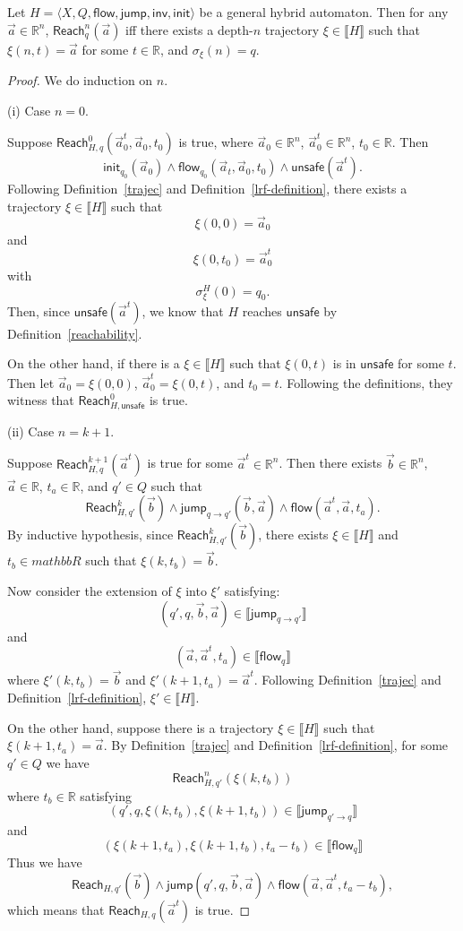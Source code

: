 \documentclass[envcountsect]{llncs}
\newcommand{\flow}{\mathsf{flow}}
\newcommand{\jump}{\mathsf{jump}}
\newcommand{\inv}{\mathsf{inv}}
\newcommand{\init}{\mathsf{init}}
\newcommand{\reach}{\mathsf{Reach}}
\newcommand{\unsafe}{\mathsf{unsafe}}
\begin{document}
\begin{proposition}\label{with-inv}
Let $H = \langle X, Q, \flow, \jump, \inv, \init \rangle$ be a general hybrid
automaton. Then for any $\vec a\in \mathbb{R}^n$, $\reach^n_q(\vec a)$ iff there
exists a depth-$n$ trajectory $\xi\in\llbracket H\rrbracket$ such that $\xi(n,
t) = \vec a$ for some $t\in\mathbb{R}$, and $\sigma_{\xi}(n) = q$. 
\end{proposition}


\begin{proof}
We do induction on $n$.

(i) Case $n=0$.

Suppose $\reach^0_{H,q}(\vec a_0^t, \vec a_0, t_0)$ is true, where $\vec a_0\in
\mathbb{R}^n$, $\vec a_0^t\in \mathbb{R}^n$, $t_0\in \mathbb{R}$. Then
$$\init_{q_0}(\vec a_0)\wedge\flow_{q_0}(\vec a_t, \vec a_0, t_0)  \wedge
\unsafe(\vec a^t).$$
Following Definition~\ref{trajec} and Definition~\ref{lrf-definition}, there
exists a trajectory $\xi\in \llbracket H\rrbracket$ such that
$$\xi(0,0) = \vec a_0$$
and 
$$\xi(0,t_0) = \vec a_0^t$$
with 
$$\sigma^H_{\xi}(0) = q_0.$$
Then, since $\unsafe(\vec a^t)$, we know that $H$ reaches $\unsafe$ by
Definition~\ref{reachability}.

On the other hand, if there is a $\xi\in \llbracket H\rrbracket$ such that
$\xi(0,t)$ is in $\unsafe$ for some $t$. Then let $\vec a_0 = \xi(0,0)$, $\vec
a_0^t = \xi(0,t)$, and $t_0 = t$. Following the definitions, they witness that
$\reach^0_{H,\unsafe}$ is true. 

(ii) Case $n=k+1$. 
 
Suppose $\reach_{H,q}^{k+1}(\vec a^t)$ is true for some $\vec
a^t\in\mathbb{R}^n$. Then there exists $\vec b\in \mathbb{R}^n$, $\vec a\in
\mathbb{R}$, $t_a\in \mathbb{R}$, and $q'\in Q$ such that
$$\reach_{H,q'}^k(\vec b) \wedge \jump_{q\rightarrow q'}(\vec b, \vec a)\wedge
\flow(\vec a^t, \vec a, t_a).$$ 
By inductive hypothesis, since $\reach_{H,q'}^k(\vec b)$, there exists
$\xi\in\llbracket H\rrbracket$ and $t_b\in mathbb{R}$ such that $\xi(k, t_b) =
\vec b$. 


Now consider the extension of $\xi$ into $\xi'$ satisfying:
$$(q', q, \vec b, \vec a)\in \llbracket \jump_{q\rightarrow q'}\rrbracket$$
and 
$$(\vec a, \vec a^t, t_a)\in \llbracket \flow_q \rrbracket$$
where $\xi'(k,t_b) = \vec b$ and $\xi'(k+1, t_a) = \vec a^t$. Following
Definition~\ref{trajec} and Definition~\ref{lrf-definition}, $\xi'\in \llbracket
H\rrbracket$. 

On the other hand, suppose there is a trajectory $\xi\in\llbracket H\rrbracket$
such that $\xi(k+1, t_a) = \vec a$. By Definition~\ref{trajec} and
Definition~\ref{lrf-definition}, for some $q'\in Q$ we have
$$\reach^n_{H,q'}(\xi(k,t_b))$$
where $t_b\in\mathbb{R}$ satisfying
$$(q', q, \xi(k,t_b), \xi(k+1,t_b))\in \llbracket \jump_{q'\rightarrow q}
\rrbracket$$
and
$$(\xi(k+1,t_a), \xi(k+1,t_b), t_a - t_b)\in \llbracket \flow_q\rrbracket$$
Thus we have 
$$\reach_{H,q'}(\vec b)\wedge \jump(q',q,\vec b, \vec a)\wedge \flow(\vec a,
\vec a^t, t_a-t_b),$$
which means that $\reach_{H,q}(\vec a^t)$ is true. 
\end{proof}
\end{document}

